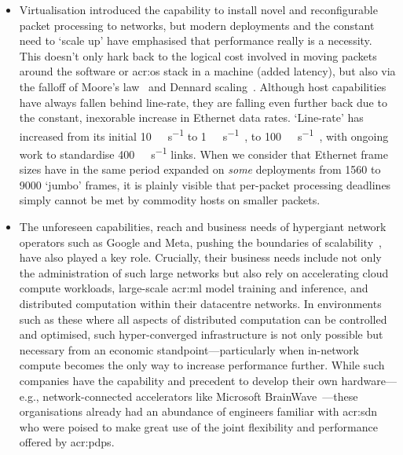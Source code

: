 \begin{itemize}
	\item Virtualisation introduced the capability to install novel and reconfigurable packet processing to networks, but modern deployments and the constant need to `scale up' have emphasised that performance really is a necessity. This doesn't only hark back to the logical cost involved in moving packets around the software or \gls{acr:os} stack in a machine (added latency), but also via the falloff of Moore's law~\parencite{moore-law} and Dennard scaling~\parencite{dennard-paper}. Although host capabilities have always fallen behind line-rate, they are falling even further back due to the constant, inexorable increase in Ethernet data rates. `Line-rate' has increased from its initial \qty{10}{\mega\bit\per\second} to \qty{1}{\giga\bit\per\second}~\parencite{gbe-standard}, to \qty{100}{\giga\bit\per\second}~\parencite{100-gbe}, with ongoing work to standardise \qty{400}{\giga\bit\per\second} links. When we consider that Ethernet frame sizes have in the same period expanded on \emph{some} deployments from \qty{1560}{\byte} to \qty{9000}{\byte} `jumbo' frames, it is plainly visible that per-packet processing deadlines simply cannot be met by commodity hosts on smaller packets.
	\item The unforeseen capabilities, reach and business needs of hypergiant network operators such as Google and Meta, pushing the boundaries of scalability~\parencite{DBLP:conf/sigcomm/GigisCMNKDKS21}, have also played a key role. Crucially, their business needs include not only the administration of such large networks but also rely on accelerating cloud compute workloads, large-scale \gls{acr:ml} model training and inference, and distributed computation within their datacentre networks. In environments such as these where all aspects of distributed computation can be controlled and optimised, such hyper-converged infrastructure is not only possible but necessary from an economic standpoint---particularly when in-network compute becomes the only way to increase performance further. While such companies have the capability and precedent to develop their own hardware---e.g., network-connected accelerators like Microsoft BrainWave~\parencite{DBLP:conf/isca/FowersOPMLLAHAG18}---these organisations already had an abundance of engineers familiar with \gls{acr:sdn} who were poised to make great use of the joint flexibility and performance offered by \glspl{acr:pdp}.
\end{itemize}
